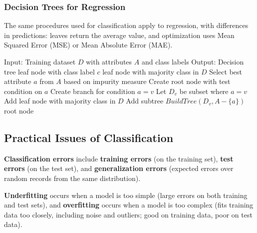 \subsubsection{Decision Trees for Regression}
The same procedures used for classification apply to regression, with differences in predictions: leaves return the average value, and optimization uses Mean Squared Error (MSE) or Mean Absolute Error (MAE).

\begin{algorithm}
\caption{Basic Decision Tree Construction}
\begin{algorithmic}[1]
\State Input: Training dataset $D$ with attributes $A$ and class labels
\State Output: Decision tree
        \State \Return leaf node with class label $c$
    \EndIf
        \State \Return leaf node with majority class in $D$
    \EndIf
    \State Select best attribute $a$ from $A$ based on impurity measure
    \State Create root node with test condition on $a$
        \State Create branch for condition $a = v$
        \State Let $D_v$ be subset where $a = v$
            \State Add leaf node with majority class in $D$
        \Else
            \State Add subtree $BuildTree(D_v, A - \{a\})$
        \EndIf
    \EndFor
    \State \Return root node
\EndFunction
\end{algorithmic}
\end{algorithm}

\subsection{Practical Issues of Classification}

\begin{definition}
\textbf{Classification errors} include \textbf{training errors} (on the training set), \textbf{test errors} (on the test set), and \textbf{generalization errors} (expected errors over random records from the same distribution).
\end{definition}

\textbf{Underfitting} occurs when a model is too simple (large errors on both training and test sets), and \textbf{overfitting} occurs when a model is too complex (fits training data too closely, including noise and outliers; good on training data, poor on test data).

